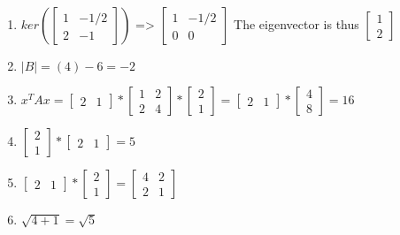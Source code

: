 \documentclass{article}
\begin{document}
\begin{enumerate}
		
		\item $ker(\begin{bmatrix}
		1 & -1/2 \\ 2 & -1
		\end{bmatrix})$ => $\begin{bmatrix}
		1 & -1/2 \\ 0 & 0 
		\end{bmatrix}$
		The eigenvector is thus $\begin{bmatrix}
		1 \\ 2
		\end{bmatrix}$
		
		
		\item $|B| = (4) - 6 = -2$
		
		
		\item $x^{T}Ax = \begin{bmatrix}
		2 & 1
		\end{bmatrix} * \begin{bmatrix} 1 & 2 \\ 2 & 4 \end{bmatrix} * \begin{bmatrix}
			2 \\ 1
		\end{bmatrix} = \begin{bmatrix}
		2 & 1
		\end{bmatrix} * \begin{bmatrix}
		4 \\ 8
		\end{bmatrix} =16 $
		
		\item $\begin{bmatrix}
		2 \\ 1
		\end{bmatrix} * \begin{bmatrix}
		2 & 1
		\end{bmatrix} = 5$
		
		\item $\begin{bmatrix}
		2 & 1
		\end{bmatrix} * \begin{bmatrix}
		2 \\ 1
		\end{bmatrix} = \begin{bmatrix}
		4 & 2 \\ 2 & 1
		\end{bmatrix} $
		
		\item $\sqrt{4+1} = \sqrt{5}$
		

\end{enumerate}
\end{document}
